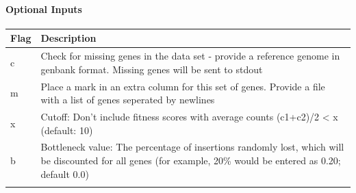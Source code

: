 \documentclass[11pt,]{article}
\let\oldparagraph\paragraph
\renewcommand{\paragraph}[1]{\oldparagraph{#1}\mbox{}}
\begin{document}
\paragraph{Optional Inputs}\label{optional-inputs-1}

\begin{longtable}[]{@{}ll@{}}
\toprule
\begin{minipage}[b]{0.06\columnwidth}\raggedright\strut
Flag\strut
\end{minipage} & \begin{minipage}[b]{0.88\columnwidth}\raggedright\strut
Description\strut
\end{minipage}\tabularnewline
\midrule
\endhead
\begin{minipage}[t]{0.06\columnwidth}\raggedright\strut
c\strut
\end{minipage} & \begin{minipage}[t]{0.88\columnwidth}\raggedright\strut
Check for missing genes in the data set - provide a reference genome in
genbank format. Missing genes will be sent to stdout\strut
\end{minipage}\tabularnewline
\begin{minipage}[t]{0.06\columnwidth}\raggedright\strut
m\strut
\end{minipage} & \begin{minipage}[t]{0.88\columnwidth}\raggedright\strut
Place a mark in an extra column for this set of genes. Provide a file
with a list of genes seperated by newlines\strut
\end{minipage}\tabularnewline
\begin{minipage}[t]{0.06\columnwidth}\raggedright\strut
x\strut
\end{minipage} & \begin{minipage}[t]{0.88\columnwidth}\raggedright\strut
Cutoff: Don't include fitness scores with average counts (c1+c2)/2
\textless{} x (default: 10)\strut
\end{minipage}\tabularnewline
\begin{minipage}[t]{0.06\columnwidth}\raggedright\strut
b\strut
\end{minipage} & \begin{minipage}[t]{0.88\columnwidth}\raggedright\strut
Bottleneck value: The percentage of insertions randomly lost, which will
be discounted for all genes (for example, 20\% would be entered as 0.20;
default 0.0)\strut
\end{minipage}\tabularnewline
\begin{minipage}[t]{0.06\columnwidth}\raggedright\strut

\end{minipage}
\end{longtable}
\end{document}
